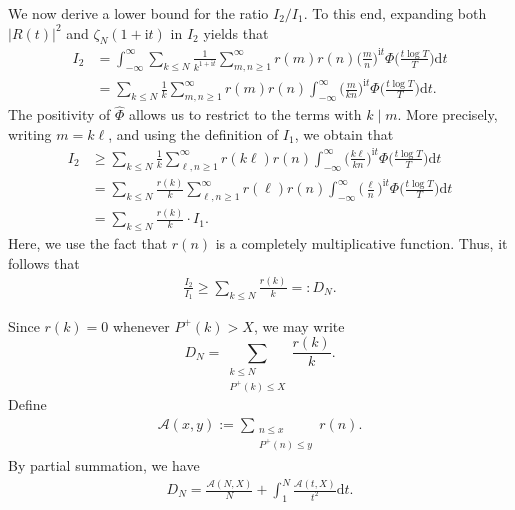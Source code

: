 \documentclass[12pt,reqno]{amsart}
\theoremstyle{definition}
\numberwithin{equation}{section}
\newcommand{\Bg}{\Big}
\newcommand{\ph}{\Phi}
\newcommand{\mca}{\mathcal{A}}
\newcommand{\mit}{\mathrm{i}t}
\newcommand{\mdt}{\mathrm{d}t}
\newcommand{\whp}{\widehat{\Phi}}
\begin{document}
We now derive a lower bound for the ratio \(I_2/I_1\). To this end, expanding both \(|R(t)|^2\) and \(\zeta_N(1+\mit)\) in \(I_2\) yields that
\begin{align*}
    I_2 &= \int_{-\infty}^{\infty} \sum_{k \le N}\frac{1}{k^{1+\mit}} \sum_{m,n \ge 1}^\infty r(m)r(n)\Bg(\frac{m}{n}\Bg)^{\mit}\ph\Bg(\frac{t\log T}{T} \Bg) \mdt\\
    &= \sum_{k \le N}\frac{1}{k}  \sum_{m,n \ge 1}^\infty r(m)r(n) \int_{-\infty}^{\infty}\Bg(\frac{m}{kn}\Bg)^{\mit}\ph\Bg(\frac{t\log T}{T} \Bg) \mdt.
\end{align*}
The positivity of \(\whp\) allows us to restrict to the terms with \(k \mid m\). More precisely, writing \(m = k\ell\), and using the definition of \(I_1\), we obtain that
\begin{align*}
    I_2 & \ge \sum_{k \le N}\frac{1}{k} \sum_{\ell,n \ge1}^\infty r(k\ell)r(n)\int_{-\infty}^{\infty}\Bg(\frac{k\ell}{kn}\Bg)^{\mit}\ph\Bg(\frac{t\log T}{T} \Bg) \mdt \\
    & = \sum_{k \le N}\frac{r(k)}{k} \sum_{\ell,n \ge1}^\infty r(\ell)r(n)  \int_{-\infty}^{\infty}\Bg(\frac{\ell}{n}\Bg)^{\mit}\ph\Bg(\frac{t\log T}{T} \Bg) \mdt \\
    & = \sum_{k \le N}\frac{r(k)}{k} \cdot I_1.
\end{align*}
Here, we use the fact that \(r(n)\) is a completely multiplicative function. Thus, it follows that
\begin{align}
    \label{I2I1lower}
    \frac{I_2}{I_1} \ge \sum_{k \le N}\frac{r(k)}{k} =: D_N.
\end{align}

Since \(r(k)=0\) whenever \(P^+(k)>X\), we may write
\[
D_N=\sum_{\substack{k\le N\\ P^+(k)\le X}}\frac{r(k)}{k}.
\]
Define
\begin{align*}
    \mca(x,y) := \sum_{\substack{n \le x \\ P^+(n) \le y}} r(n). 
\end{align*}
By partial summation, we have
\begin{align}
    \label{DNeq}
    D_N=\frac{\mca(N,X)}{N}+ \int_1^N\frac{\mca(t,X)}{t^2}\mdt.
\end{align}
\end{document}

